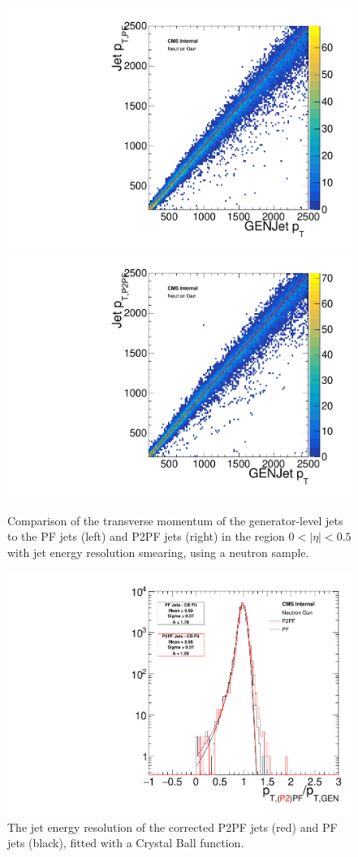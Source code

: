 \begin{figure}[ht]
  \centering
 \includegraphics[width=.48\textwidth]{pt_neutron_gun_th2f_005.pdf} \hfill
\includegraphics[width=.48\textwidth]{pt_neutron_gun_p2pf_th2f_005.pdf}
 \caption{Comparison of the transverse momentum of the generator-level jets to the \ac{PF} jets (left) and P2PF jets (right) in the region $0< |\eta| < 0.5$ with jet energy resolution smearing, using a neutron sample.}
 \label{fig:neutron_corr}
\end{figure}

\begin{figure}[ht]
  \centering
 \includegraphics[width=.75\textwidth]{pt_neutron_gun_res_fit_005.pdf} 
 \caption{The jet energy resolution of the corrected P2PF jets (red) and \ac{PF} jets (black), fitted with a Crystal Ball function.}
 \label{fig:neutron_res_corr}
\end{figure}

\clearpage
\clearpage{\pagestyle{empty}\cleardoublepage}
